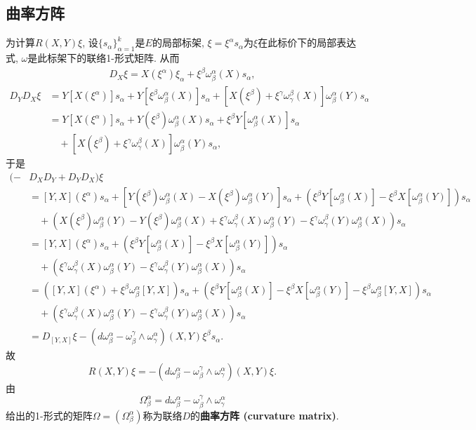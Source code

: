 \subsection{曲率方阵}
为计算$R(X,Y)\xi$, 设$\{s_\alpha\}_{\alpha=1}^k$是$E$的局部标架, $\xi=\xi^\alpha s_\alpha$为$\xi$在此标价下的局部表达式, $\omega$是此标架下的联络1-形式矩阵. 从而
$$
\begin{aligned}
D_X\xi=X(\xi^\alpha)\xi_\alpha+\xi^\beta\omega_\beta^\alpha(X) s_\alpha,
\end{aligned}
$$
$$
\begin{aligned}
D_YD_X\xi&=Y[X(\xi^\alpha)]s_\alpha+Y[\xi^\beta\omega_\beta^\alpha(X)] s_\alpha
+[X(\xi^\beta)+\xi^\gamma\omega_\gamma^\beta(X)]\omega_\beta^\alpha(Y) s_\alpha \\
&=Y[X(\xi^\alpha)]s_\alpha+Y(\xi^\beta)\omega_\beta^\alpha(X)s_\alpha+\xi^\beta Y[\omega_\beta^\alpha(X)]s_\alpha\\
&\quad+[X(\xi^\beta)+\xi^\gamma\omega_\gamma^\beta(X)]\omega_\beta^\alpha(Y) s_\alpha ,
\end{aligned}
$$
于是
$$
\begin{aligned}
(-&D_XD_Y+D_YD_X)\xi\\
&=[Y,X](\xi^\alpha)s_\alpha
+[Y(\xi^\beta)\omega_\beta^\alpha(X)-X(\xi^\beta)\omega_\beta^\alpha(Y)]s_\alpha+\left(\xi^\beta Y[\omega_\beta^\alpha(X)]-\xi^\beta X[\omega_\beta^\alpha(Y)]\right)s_\alpha\\
&\quad+\left(X(\xi^\beta)\omega_\beta^\alpha(Y)-Y(\xi^\beta)\omega_\beta^\alpha(X)+\xi^\gamma\omega_\gamma^\beta(X)\omega_\beta^\alpha(Y)-\xi^\gamma\omega_\gamma^\beta(Y)\omega_\beta^\alpha(X) \right)s_\alpha\\
&=[Y,X](\xi^\alpha)s_\alpha+\left(\xi^\beta Y[\omega_\beta^\alpha(X)]-\xi^\beta X[\omega_\beta^\alpha(Y)]\right)s_\alpha\\
&\quad+\left(\xi^\gamma\omega_\gamma^\beta(X)\omega_\beta^\alpha(Y)-\xi^\gamma\omega_\gamma^\beta(Y)\omega_\beta^\alpha(X) \right)s_\alpha\\
&=\left([Y,X](\xi^\alpha)+\xi^\beta\omega_\beta^\alpha[Y,X]\right)s_\alpha
+\left(\xi^\beta Y[\omega_\beta^\alpha(X)]-\xi^\beta X[\omega_\beta^\alpha(Y)]-\xi^\beta\omega_\beta^\alpha[Y,X]\right)s_\alpha\\
&\quad+\left(\xi^\gamma\omega_\gamma^\beta(X)\omega_\beta^\alpha(Y)-\xi^\gamma\omega_\gamma^\beta(Y)\omega_\beta^\alpha(X) \right)s_\alpha\\
&=D_{[Y,X]}\xi-(d\omega_\beta^\alpha-\omega_\beta^\gamma\wedge\omega_\gamma^\alpha)(X,Y)\xi^\beta s_\alpha.
\end{aligned}
$$
故
$$
R(X,Y)\xi=-(d\omega_\beta^\alpha-\omega_\beta^\gamma\wedge\omega_\gamma^\alpha)(X,Y)\xi.
$$
由
$$
\Omega_\beta^\alpha=d\omega_\beta^\alpha-\omega_\beta^\gamma\wedge\omega_\gamma^\alpha
$$
给出的1-形式的矩阵$\Omega=(\Omega_\beta^\alpha)$称为联络$D$的\textbf{曲率方阵 (curvature matrix)}. 

